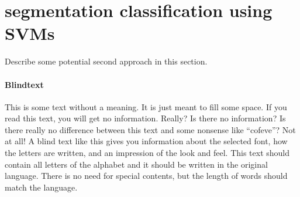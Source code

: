 \section{segmentation classification using SVMs} \label{approach2}

Describe some potential second approach in this section.

\paragraph{Blindtext} This is some text without a meaning. It is just meant to fill some space. If you read this text, you will get no information. Really? Is there no information? Is there really no difference between this text and some nonsense like ``cofeve''? Not at all! A blind text like this gives you information about the selected font, how the letters are written, and an impression of the look and feel. This text should contain all letters of the alphabet and it should be written in the original language. There is no need for special contents, but the length of words should match the language.

